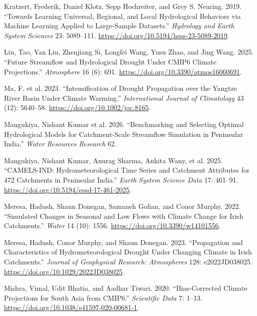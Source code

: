 \documentclass[
  english,
  11pt,
]{article}
\newlength{\cslhangindent}
\newenvironment{CSLReferences}[2] %
 {\begin{list}{}{%
  \setlength{\itemindent}{0pt}
  \setlength{\leftmargin}{0pt}
  \setlength{\parsep}{0pt}
  \ifodd #1
   \setlength{\leftmargin}{\cslhangindent}
   \setlength{\itemindent}{-1\cslhangindent}
  \fi
  \setlength{\itemsep}{#2\baselineskip}}}
 {\end{list}}
\begin{document}
\begin{CSLReferences}{1}{1}
Kratzert, Frederik, Daniel Klotz, Sepp Hochreiter, and Grey S. Nearing.
2019. {``Towards Learning Universal, Regional, and Local Hydrological
Behaviors via Machine Learning Applied to Large-Sample Datasets.''}
\emph{Hydrology and Earth System Sciences} 23: 5089--111.
\url{https://doi.org/10.5194/hess-23-5089-2019}.

Liu, Tao, Yan Liu, Zhenjiang Si, Longfei Wang, Yusu Zhao, and Jing Wang.
2025. {``Future Streamflow and Hydrological Drought Under {CMIP6}
Climate Projections.''} \emph{Atmosphere} 16 (6): 691.
\url{https://doi.org/10.3390/atmos16060691}.

{Ma, F. et al.} 2023. {``Intensification of Drought Propagation over the
{Yangtze River} Basin Under Climate Warming.''} \emph{International
Journal of Climatology} 43 (12): 5640--58.
\url{https://doi.org/10.1002/joc.8165}.

{Mangukiya, Nishant Kumar et al.} 2026. {``Benchmarking and Selecting
Optimal Hydrological Models for Catchment-Scale Streamflow Simulation in
{Peninsular India}.''} \emph{Water Resources Research} 62.

{Mangukiya, Nishant Kumar, Anurag Sharma, Ankita Wany, et al.} 2025.
{``{CAMELS-IND}: Hydrometeorological Time Series and Catchment
Attributes for 472 Catchments in Peninsular India.''} \emph{Earth System
Science Data} 17: 461--91.
\url{https://doi.org/10.5194/essd-17-461-2025}.

Meresa, Hadush, Shaun Donegan, Samaneh Golian, and Conor Murphy. 2022.
{``Simulated Changes in Seasonal and Low Flows with Climate Change for
{Irish} Catchments.''} \emph{Water} 14 (10): 1556.
\url{https://doi.org/10.3390/w14101556}.

Meresa, Hadush, Conor Murphy, and Shaun Donegan. 2023. {``Propagation
and Characteristics of Hydrometeorological Drought Under Changing
Climate in {Irish} Catchments.''} \emph{Journal of Geophysical Research:
Atmospheres} 128: e2022JD038025.
\url{https://doi.org/10.1029/2022JD038025}.

Mishra, Vimal, Udit Bhatia, and Aadhar Tiwari. 2020. {``Bias-Corrected
Climate Projections for {South Asia} from {CMIP6}.''} \emph{Scientific
Data} 7: 1--13. \url{https://doi.org/10.1038/s41597-020-00681-1}.


\end{CSLReferences}
\end{document}
